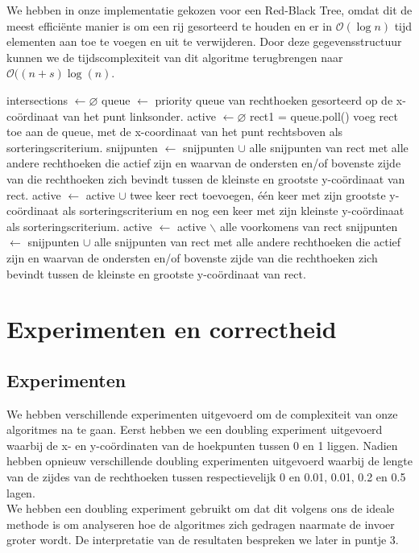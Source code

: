 \documentclass[11pt,a4paper,titlepage]{article}
\begin{document}
	We hebben in onze implementatie gekozen voor een Red-Black Tree, omdat dit de meest efficiënte manier is om een rij gesorteerd te houden en er in  $\mathcal{O}(\log n)$ tijd elementen aan toe te voegen en uit te verwijderen. Door deze gegevensstructuur kunnen we de tijdscomplexiteit van dit algoritme terugbrengen naar $\mathcal{O}((n + s)\log(n).$
		\begin{algorithm}[H]
			\caption{}
			\begin{algorithmic}[1]
				\State intersections $\gets \varnothing $
				\State queue $\gets$ priority queue van rechthoeken gesorteerd op de x-coördinaat van het punt linksonder.
				\State active $\gets \varnothing$
				\State rect1 = queue.poll()
				\State voeg rect toe aan de queue, met de x-coordinaat van het punt rechtsboven als sorteringscriterium.
				\State snijpunten $\gets$ snijpunten $\cup$ alle snijpunten van rect met alle andere rechthoeken die actief zijn en waarvan de ondersten en/of bovenste zijde van die rechthoeken zich bevindt tussen de kleinste en grootste y-coördinaat van rect.
				\State active $\gets$ active $\cup$ twee keer rect toevoegen, één keer met zijn grootste y-coördinaat als sorteringscriterium en nog een keer met zijn kleinste y-coördinaat als sorteringscriterium.
				\Else
				\State active $\gets$ active $\backslash$ alle voorkomens van rect
				\State snijpunten $\gets$ snijpunten $\cup$ alle snijpunten van rect met alle andere rechthoeken die actief zijn en waarvan de ondersten en/of bovenste zijde van die rechthoeken zich bevindt tussen de kleinste en grootste y-coördinaat van rect.
				\EndIf
				\EndWhile
			\end{algorithmic}
		\end{algorithm}
	
	\section{Experimenten en correctheid}
		\subsection{Experimenten}
		We hebben verschillende experimenten uitgevoerd om de complexiteit van onze algoritmes na te gaan. Eerst hebben we een doubling experiment uitgevoerd waarbij de x- en y-coördinaten van de hoekpunten tussen 0 en 1 liggen.  Nadien hebben opnieuw verschillende doubling experimenten uitgevoerd waarbij de lengte van de zijdes van de rechthoeken tussen  respectievelijk 0 en 0.01, 0.01, 0.2 en 0.5 lagen.\\ We hebben een doubling experiment gebruikt om dat dit volgens ons de ideale methode is om analyseren hoe de algoritmes zich gedragen naarmate de invoer groter wordt. De interpretatie van de resultaten bespreken we later in puntje 3.
\end{document}
